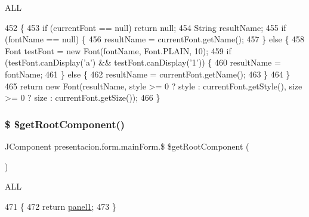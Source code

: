 A\+LL 
\begin{DoxyCode}
452                                                                                        \{
453         \textcolor{keywordflow}{if} (currentFont == null) \textcolor{keywordflow}{return} null;
454         String resultName;
455         \textcolor{keywordflow}{if} (fontName == null) \{
456             resultName = currentFont.getName();
457         \} \textcolor{keywordflow}{else} \{
458             Font testFont = \textcolor{keyword}{new} Font(fontName, Font.PLAIN, 10);
459             \textcolor{keywordflow}{if} (testFont.canDisplay(\textcolor{charliteral}{'a'}) && testFont.canDisplay(\textcolor{charliteral}{'1'})) \{
460                 resultName = fontName;
461             \} \textcolor{keywordflow}{else} \{
462                 resultName = currentFont.getName();
463             \}
464         \}
465         \textcolor{keywordflow}{return} \textcolor{keyword}{new} Font(resultName, style >= 0 ? style : currentFont.getStyle(), size >= 0 ? size : 
      currentFont.getSize());
466     \}
\end{DoxyCode}
\mbox{\label{classpresentacion_1_1form_1_1mainForm_a7a42bc26bc20cc928c82bac33c43764c}} 
\subsubsection{\texorpdfstring{\$ \$get\+Root\+Component()}{$ $getRootComponent()}}
{\footnotesize\ttfamily J\+Component presentacion.\+form.\+main\+Form.\$ \$get\+Root\+Component (\begin{DoxyParamCaption}{ }\end{DoxyParamCaption})\hspace{0.3cm}{\ttfamily [inline]}}

A\+LL 
\begin{DoxyCode}
471                                                \{
472         \textcolor{keywordflow}{return} \hyperlink{classpresentacion_1_1form_1_1mainForm_aa43e009cc6dc09d4e637385fbd361510}{panel1};
473     \}
\end{DoxyCode}
\mbox{\label{classpresentacion_1_1form_1_1mainForm_aed3c3dcfaece65c649c095e292eca671}} 
